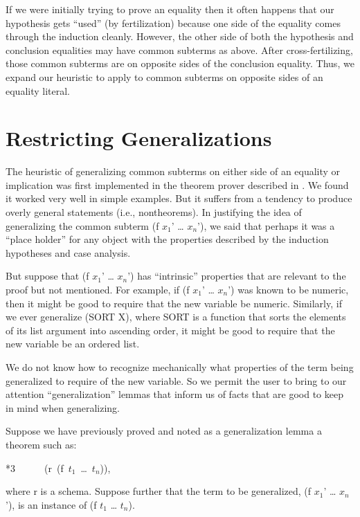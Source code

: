 \documentclass[11pt]{book}
\newenvironment{pubasis}{\begin{flushleft}\ttfamily\small}{\normalsize\rmfamily\end{flushleft}}
\newcommand{\pubdefaulttextsize}{\large}
\begin{document}
If we were initially trying to prove an equality then it often happens
that our hypothesis gets ``used'' (by fertilization) because one side
of the equality comes through the induction cleanly.  However, the
other side of both the hypothesis and conclusion equalities may
have common subterms as above.  After cross-fertilizing, those common
subterms are on opposite sides of the conclusion equality.
Thus, we expand our heuristic to apply to
common subterms on opposite sides of an equality literal.
\section{Restricting Generalizations}
\pubdefaulttextsize
The heuristic of generalizing common subterms on either side of an
equality or implication was first implemented in the theorem prover
described in \cite{JACM}.  We found it worked very well in simple
examples.  But it suffers from a tendency to produce
overly general statements (i.e., nontheorems).  In justifying the
idea of generalizing the common subterm (f $x_{1}$' \ldots{} $x_{n}$'), we said that perhaps it
was  a ``place holder'' for any object with the properties
described by the induction hypotheses and case analysis.

But suppose that (f $x_{1}$' \ldots{} $x_{n}$') has ``intrinsic''
properties that are relevant to the proof but not mentioned.
For example, if (f $x_{1}$' \ldots{} $x_{n}$') was known to be numeric, then it might be good
to require that the new variable be numeric.  Similarly, if
we ever generalize (SORT X), where SORT is a function that sorts
the elements of its list argument into ascending order, it might
be good to require that the new variable be an ordered list.

We do not know how to recognize mechanically what
properties of the term being generalized to require
of the new variable.  So we permit the user to bring to
our attention ``generalization'' lemmas that inform us of facts
that are good to keep in mind when generalizing.

Suppose we have previously proved and noted as a generalization lemma a
theorem such as:
\begin{pubasis}
*3~~~~~~(r~(f~$t_{1}$~\ldots{}~$t_{n}$)),\\
\end{pubasis}
where r is a schema.
Suppose further that the term to be generalized, (f $x_{1}$' \ldots{} $x_{n}$'), is an
instance of  (f $t_{1}$ \ldots{} $t_{n}$).
\end{document}
